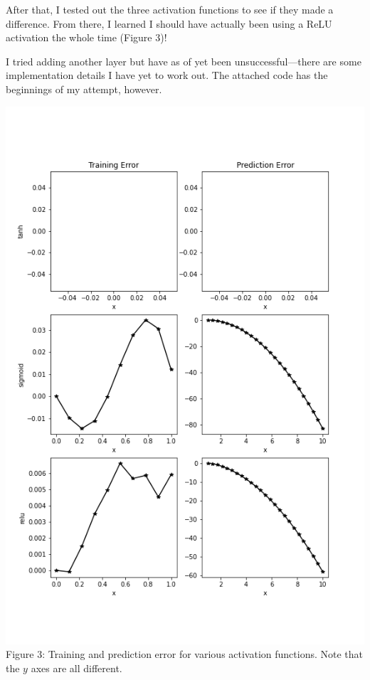 \documentclass{letter}
\begin{document}
{    After that, I tested out the three activation functions to see if they made a difference. From there, I learned I should have actually been using a ReLU activation the whole time (Figure 3)! 

    I tried adding another layer but have as of yet been unsuccessful---there are some implementation details I have yet to work out. The attached code has the beginnings of my attempt, however.
    
    \begin{center}
        \includegraphics[scale=0.75, trim={0cm 2cm 2cm 2cm}, clip]{code/activations.png} \\
        Figure 3: Training and prediction error for various activation functions. Note that the $y$ axes are all different.
    \end{center}}
\end{document}
